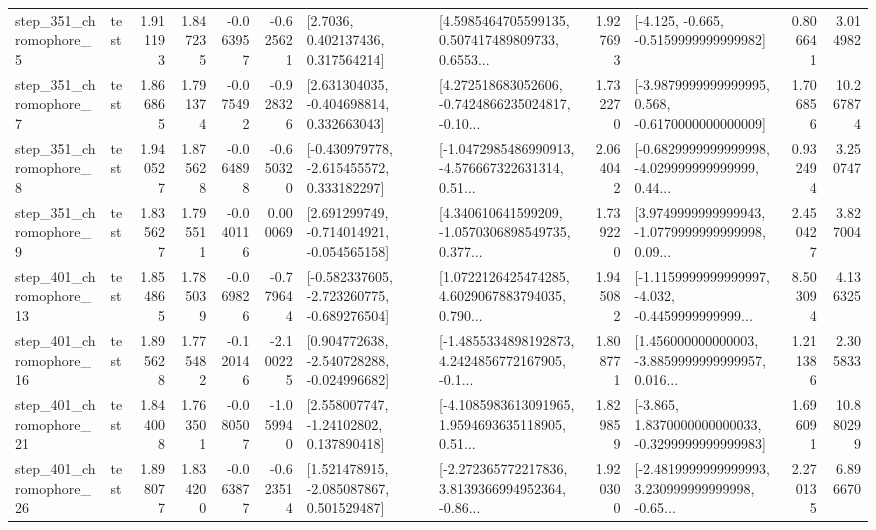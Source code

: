 \begin{tabular}{llrrrrllrlrr}
   step\_351\_chromophore\_5 &      test &      1.911193 &    1.847235 &     -0.063957 & -0.625621 &          [2.7036, 0.402137436, 0.317564214] &  [4.5985464705599135, 0.507417489809733, 0.6553... &       1.927693 &              [-4.125, -0.665, -0.5159999999999982] &            0.806641 &          3.014982 \\
   step\_351\_chromophore\_7 &      test &      1.866865 &    1.791374 &     -0.075492 & -0.928326 &    [2.631304035, -0.404698814, 0.332663043] &  [4.272518683052606, -0.7424866235024817, -0.10... &       1.732270 &  [-3.9879999999999995, 0.568, -0.6170000000000009] &            1.706856 &         10.267874 \\
   step\_351\_chromophore\_8 &      test &      1.940527 &    1.875628 &     -0.064898 & -0.650320 &   [-0.430979778, -2.615455572, 0.333182297] &  [-1.0472985486990913, -4.576667322631314, 0.51... &       2.064042 &  [-0.6829999999999998, -4.029999999999999, 0.44... &            0.932494 &          3.250747 \\
   step\_351\_chromophore\_9 &      test &      1.835627 &    1.795511 &     -0.040116 &  0.000069 &   [2.691299749, -0.714014921, -0.054565158] &  [4.340610641599209, -1.0570306898549735, 0.377... &       1.739220 &  [3.9749999999999943, -1.0779999999999998, 0.09... &            2.450427 &          3.827004 \\
  step\_401\_chromophore\_13 &      test &      1.854865 &    1.785039 &     -0.069826 & -0.779644 &  [-0.582337605, -2.723260775, -0.689276504] &  [1.0722126425474285, 4.6029067883794035, 0.790... &       1.945082 &  [-1.1159999999999997, -4.032, -0.4459999999999... &            8.503094 &          4.136325 \\
  step\_401\_chromophore\_16 &      test &      1.895628 &    1.775482 &     -0.120146 & -2.100225 &   [0.904772638, -2.540728288, -0.024996682] &  [-1.4855334898192873, 4.2424856772167905, -0.1... &       1.808771 &  [1.456000000000003, -3.8859999999999957, 0.016... &            1.211386 &          2.305833 \\
  step\_401\_chromophore\_21 &      test &      1.844008 &    1.763501 &     -0.080507 & -1.059940 &     [2.558007747, -1.24102802, 0.137890418] &  [-4.1085983613091965, 1.9594693635118905, 0.51... &       1.829859 &  [-3.865, 1.8370000000000033, -0.3299999999999983] &            1.696091 &         10.880299 \\
  step\_401\_chromophore\_26 &      test &      1.898077 &    1.834200 &     -0.063877 & -0.623514 &    [1.521478915, -2.085087867, 0.501529487] &  [-2.272365772217836, 3.8139366994952364, -0.86... &       1.920300 &  [-2.4819999999999993, 3.230999999999998, -0.65... &            2.270135 &          6.896670 \\

\end{tabular}
